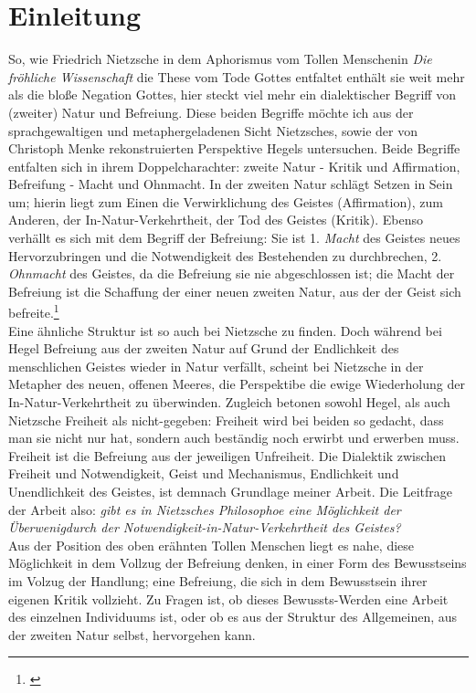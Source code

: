 \documentclass[12pt, a4paper, openany]{report}
\newcommand\mainmatter{ \cleardoublepage \pagenumbering{arabic}}
\begin{document}
\tableofcontents

\mainmatter

\chapter{Einleitung}
So, wie Friedrich Nietzsche in dem Aphorismus vom \glqq Tollen Menschen\grqq in \textit{Die fröhliche Wissenschaft} die These vom Tode Gottes entfaltet enthält sie weit mehr als die bloße Negation Gottes, hier steckt viel mehr ein dialektischer Begriff von (zweiter) Natur und Befreiung.
Diese beiden Begriffe möchte ich aus der sprachgewaltigen und metaphergeladenen Sicht Nietzsches, sowie der von Christoph Menke rekonstruierten Perspektive Hegels untersuchen.
Beide Begriffe entfalten sich in ihrem Doppelcharachter: zweite Natur - Kritik und Affirmation, Befreifung - Macht und Ohnmacht.
In der zweiten Natur schlägt Setzen in Sein um; hierin liegt zum Einen die Verwirklichung des Geistes (Affirmation), zum Anderen, der In-Natur-Verkehrtheit, der Tod des Geistes (Kritik).
Ebenso verhällt es sich mit dem Begriff der Befreiung: 
Sie ist 1. \textit{Macht} des Geistes neues Hervorzubringen und die Notwendigkeit des Bestehenden zu durchbrechen, 
2. \textit{Ohnmacht} des Geistes, da die Befreiung sie nie abgeschlossen ist; die Macht der Befreiung ist die Schaffung der einer neuen zweiten Natur, aus der der Geist sich befreite.\footnote{\citeauthor[Vgl.][80]{menke_autonomie_2018}}\\
Eine ähnliche Struktur ist so auch bei Nietzsche zu finden.
Doch während bei Hegel Befreiung aus der zweiten Natur auf Grund der Endlichkeit des menschlichen Geistes wieder in Natur verfällt, scheint bei Nietzsche in der Metapher des neuen, offenen Meeres, die Perspektibe die ewige Wiederholung der In-Natur-Verkehrtheit zu überwinden.
Zugleich betonen sowohl Hegel, als auch Nietzsche Freiheit als nicht-gegeben: 
Freiheit wird bei beiden so gedacht, dass man sie \glqq nicht nur hat, sondern auch beständig  noch erwirbt und erwerben muss\grqq{}. Freiheit ist die Befreiung aus der jeweiligen Unfreiheit.
Die Dialektik zwischen Freiheit und Notwendigkeit, Geist und Mechanismus, Endlichkeit und Unendlichkeit des Geistes, ist demnach Grundlage meiner Arbeit. Die Leitfrage der Arbeit also: \textit{gibt es in Nietzsches Philosophoe eine Möglichkeit der Überwenigdurch der Notwendigkeit-in-Natur-Verkehrtheit des Geistes?}\\
Aus der Position des oben erähnten \glqq Tollen Menschen\grqq{} liegt es nahe, diese Möglichkeit in dem Vollzug der Befreiung denken, in einer Form des Bewusstseins im Volzug der Handlung; 
eine Befreiung, die sich in dem Bewusstsein ihrer eigenen Kritik vollzieht.
Zu Fragen ist, ob dieses Bewussts-Werden eine Arbeit des einzelnen Individuums ist, oder ob es aus der Struktur des Allgemeinen, aus der zweiten Natur selbst, hervorgehen kann.
\end{document}
